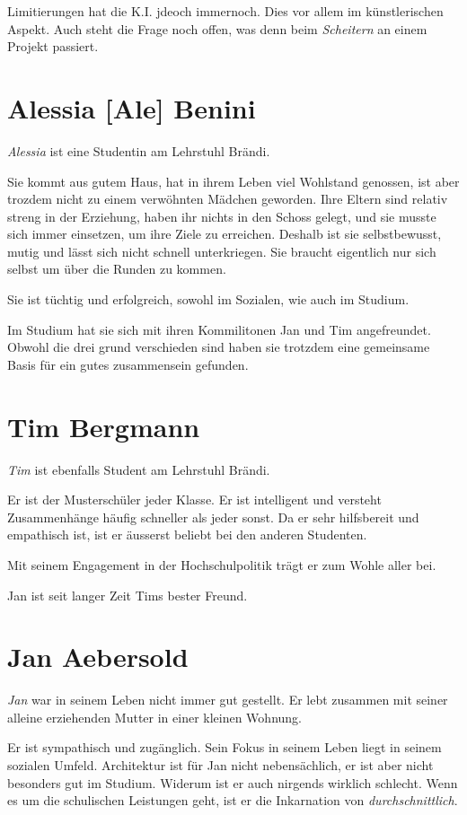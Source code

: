 \documentclass[11pt,a4paper,ngerman]{scrreprt}
\begin{document}
Limitierungen hat die K.I. jdeoch immernoch. Dies vor allem im künstlerischen
Aspekt. Auch steht die Frage noch offen, was denn beim \emph{Scheitern} an einem
Projekt passiert.

\section*{Alessia [Ale] Benini}

\emph{Alessia} ist eine Studentin am Lehrstuhl Brändi.

Sie kommt aus gutem Haus, hat in ihrem Leben viel Wohlstand genossen, ist
aber trozdem nicht zu einem verwöhnten Mädchen geworden. Ihre Eltern sind
relativ streng in der Erziehung, haben ihr nichts in den Schoss gelegt, und
sie musste sich immer einsetzen, um ihre Ziele zu erreichen. Deshalb ist sie
selbstbewusst, mutig und lässt sich nicht schnell unterkriegen. Sie braucht
eigentlich nur sich selbst um über die Runden zu kommen.

Sie ist tüchtig und erfolgreich, sowohl im Sozialen, wie auch im Studium.

Im Studium hat sie sich mit ihren Kommilitonen Jan und Tim
angefreundet. Obwohl die drei grund verschieden sind haben sie trotzdem eine
gemeinsame Basis für ein gutes zusammensein gefunden.

\section*{Tim Bergmann}

\emph{Tim} ist ebenfalls Student am Lehrstuhl Brändi.

Er ist der Musterschüler jeder Klasse. Er ist intelligent und versteht
Zusammenhänge häufig schneller als jeder sonst. Da er sehr hilfsbereit und
empathisch ist, ist er äusserst beliebt bei den anderen Studenten.

Mit seinem Engagement in der Hochschulpolitik trägt er zum Wohle aller bei.

Jan ist seit langer Zeit Tims bester Freund.

\section*{Jan Aebersold}

\emph{Jan} war in seinem Leben nicht immer gut gestellt. Er lebt zusammen mit
seiner alleine erziehenden Mutter in einer kleinen Wohnung.

Er ist sympathisch und zugänglich. Sein Fokus in seinem Leben liegt in seinem
sozialen Umfeld. Architektur ist für Jan nicht nebensächlich, er ist aber
nicht besonders gut im Studium. Widerum ist er auch nirgends wirklich
schlecht. Wenn es um die schulischen Leistungen geht, ist er die Inkarnation
von \emph{durchschnittlich}.
\end{document}

